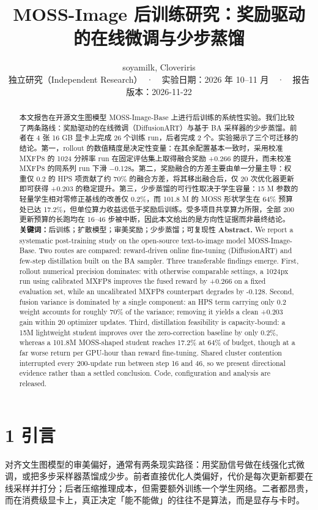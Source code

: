 \documentclass[10.5pt,a4paper]{ctexart}
\title{\bfseries MOSS-Image 后训练研究：奖励驱动的在线微调与少步蒸馏}
\author{soyamilk, Cloveriris\\[4pt]\small 独立研究（Independent Research）　·　实验日期：2026 年 10–11 月　·　报告版本：2026-11-22}
\date{}
\begin{document}
\maketitle
\begin{abstract}
\noindent 本文报告在开源文生图模型 MOSS-Image-Base 上进行后训练的系统性实验。我们比较了两条路线：奖励驱动的在线微调（DiffusionART）与基于 BA 采样器的少步蒸馏。前者在 4 张 16 GB 显卡上完成 26 个训练 run，后者完成 2 个。实验揭示了三个可迁移的结论。第一，rollout 的数值精度是决定性变量：在其余配置基本一致时，采用校准 MXFP8 的 1024 分辨率 run 在固定评估集上取得融合奖励 +0.266 的提升，而未校准 MXFP8 的同系列 run 下滑 −0.128。第二，奖励融合的方差主要由单一分量主导：权重仅 0.2 的 HPS 项贡献了约 70\% 的融合方差，将其移出融合后，仅 20 次优化器更新即可获得 +0.203 的稳定提升。第三，少步蒸馏的可行性取决于学生容量：15 M 参数的轻量学生相对零修正基线的改善仅 0.2\%，而 101.8 M 的 MOSS 形状学生在 64\% 预算处已达 17.2\%，但单位算力收益远低于奖励后训练。受多项目共享算力所限，全部 200 更新预算的长跑均在 16–46 步被中断，因此本文给出的是方向性证据而非最终结论。
\vspace{4pt}\noindent\textbf{关键词：}后训练；扩散模型；审美奖励；少步蒸馏；可复现性
\vspace{6pt}\noindent\textbf{Abstract.} We report a systematic post-training study on the open-source text-to-image model MOSS-Image-Base. Two routes are compared: reward-driven online fine-tuning (DiffusionART) and few-step distillation built on the BA sampler. Three transferable findings emerge. First, rollout numerical precision dominates: with otherwise comparable settings, a 1024px run using calibrated MXFP8 improves the fused reward by +0.266 on a fixed evaluation set, while an uncalibrated MXFP8 counterpart degrades by -0.128. Second, fusion variance is dominated by a single component: an HPS term carrying only 0.2 weight accounts for roughly 70\% of the variance; removing it yields a clean +0.203 gain within 20 optimizer updates. Third, distillation feasibility is capacity-bound: a 15M lightweight student improves over the zero-correction baseline by only 0.2\%, whereas a 101.8M MOSS-shaped student reaches 17.2\% at 64\% of budget, though at a far worse return per GPU-hour than reward fine-tuning. Shared cluster contention interrupted every 200-update run between step 16 and 46, so we present directional evidence rather than a settled conclusion. Code, configuration and analysis are released.
\end{abstract}
\section*{1 引言}
对齐文生图模型的审美偏好，通常有两条现实路径：用奖励信号做在线强化式微调，或把多步采样器蒸馏成少步。前者直接优化人类偏好，代价是每次更新都要在线采样并打分；后者压缩推理成本，但需要额外训练一个学生网络。二者都昂贵，而在消费级显卡上，真正决定「能不能做」的往往不是算法，而是显存与卡时。
\end{document}
